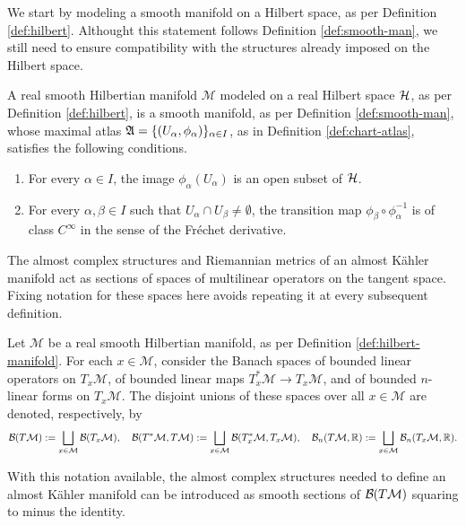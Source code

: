 We start by modeling a smooth manifold on a Hilbert space, as per Definition \ref{def:hilbert}. Althought this statement follows Definition \ref{def:smooth-man}, we still need to ensure compatibility with the structures already imposed on the Hilbert space. 

\begin{definition}
	\label{def:hilbert-manifold}
	A real smooth Hilbertian manifold $\mathcal{M}$ modeled on a real Hilbert space $\H$, as per Definition \ref{def:hilbert}, is a smooth manifold, as per Definition \ref{def:smooth-man}, whose maximal atlas $\mathfrak{A} = \{(U_\alpha, \phi_\alpha)\}_{\alpha \in I}$, as in Definition \ref{def:chart-atlas}, satisfies the following conditions.
	\begin{enumerate}
		\item For every $\alpha \in I$, the image $\phi_\alpha(U_\alpha)$ is an open subset of $\H$.
		\item For every $\alpha, \beta \in I$ such that $U_\alpha \cap U_\beta \neq \emptyset$, the transition map $\phi_\beta \circ \phi_\alpha^{-1}$ is of class $C^\infty$ in the sense of the Fréchet derivative.
	\end{enumerate}
\end{definition}

\noindent The almost complex structures and Riemannian metrics of an almost Kähler manifold act as sections of spaces of multilinear operators on the tangent space. Fixing notation for these spaces here avoids repeating it at every subsequent definition.

\begin{definition}
	\label{def:families-multilinear}
	Let $\mathcal{M}$ be a real smooth Hilbertian manifold, as per Definition \ref{def:hilbert-manifold}. For each $x \in \mathcal{M}$, consider the Banach spaces of bounded linear operators on $T_x\mathcal{M}$, of bounded linear maps $T_x^*\mathcal{M}\to T_x\mathcal{M}$, and of bounded $n$-linear forms on $T_x\mathcal{M}$. The disjoint unions of these spaces over all $x \in \mathcal{M}$ are denoted, respectively, by
	\[
		\B(T\mathcal{M}) := \bigsqcup_{x \in \mathcal{M}} \B(T_x\mathcal{M}), \quad \B(T^*\mathcal{M},T\mathcal{M}) := \bigsqcup_{x \in \mathcal{M}} \B(T_x^*\mathcal{M},T_x\mathcal{M}) , \quad \B_n(T\mathcal{M},\R) :=  \bigsqcup_{x \in \mathcal{M}}\B_n(T_x\mathcal{M},\R).
	\]
\end{definition}

\noindent With this notation available, the almost complex structures
needed to define an almost Kähler manifold can be introduced as smooth
sections of $\B(T\mathcal{M})$ squaring to minus the identity.

